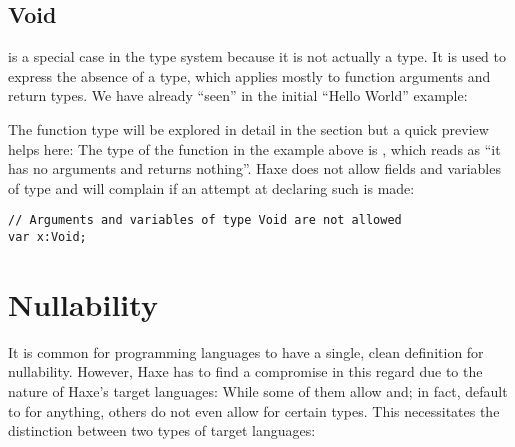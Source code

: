 \subsection{Void}
\label{types-void}


 is a special case in the type system because it is not actually a type. It is used to express the absence of a type, which applies mostly to function arguments and return types.
We have already ``seen''  in the initial ``Hello World'' example:


The function type will be explored in detail in the section  but a quick preview helps here: The type of the function  in the example above is , which reads as ``it has no arguments and returns nothing''.
Haxe does not allow fields and variables of type  and will complain if an attempt at declaring such is made:

\begin{lstlisting}
// Arguments and variables of type Void are not allowed
var x:Void;
\end{lstlisting}



\section{Nullability}
\label{types-nullability}


It is common for programming languages to have a single, clean definition for nullability. However, Haxe has to find a compromise in this regard due to the nature of Haxe's target languages: While some of them allow and; in fact, default to  for anything, others do not even allow  for certain types. This necessitates the distinction between two types of target languages:


